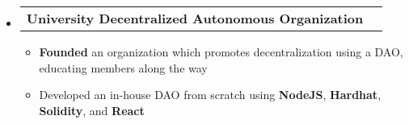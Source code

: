 \documentclass[letterpaper,11pt]{article}
\makeatletter
\newcommand{\resumeItem}[1]{
  \item\small{
    {#1 \vspace{-1pt}}
  }
}
\newcommand{\resumeExtracurricularsHeading}[1]{
    \item
    \begin{tabular*}{\textwidth}{l@{\extracolsep{\fill}}r}
      #1 & {\color{dark-grey}} \\
    \end{tabular*}\vspace{-7pt}
}
\newcommand{\resumeSubHeadingListStart}{\begin{itemize}[leftmargin=0in, label={}]}
\newcommand{\resumeSubHeadingListEnd}{\end{itemize}}
\newcommand{\resumeItemListStart}{\begin{itemize}\setlength{\itemindent}{-1em}}
\newcommand{\resumeItemListEnd}{\end{itemize}\vspace{0pt}}
\makeatother
\begin{document}
\resumeSubHeadingListStart
\resumeExtracurricularsHeading
{\textbf{University Decentralized Autonomous Organization}}
\resumeItemListStart
\resumeItem{\textbf{Founded} an organization which promotes decentralization using a DAO, educating members along the way}
\resumeItem{Developed an in-house DAO from scratch using \textbf{NodeJS}, \textbf{Hardhat}, \textbf{Solidity}, and \textbf{React}}
\resumeItemListEnd
\resumeSubHeadingListEnd
\end{document}
